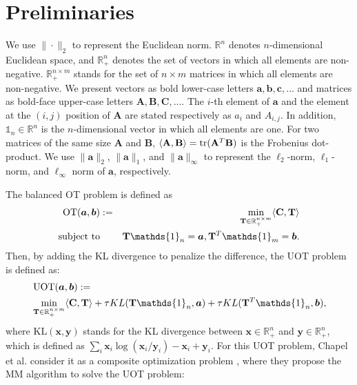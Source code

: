 \documentclass[a4paper,twocolumn]{article}
\newcommand{\R}{\mathbb{R}}
\newcommand{\one}{\mathds{1}}
\newcommand{\mat}[1]{\mathbf{#1}}
\renewcommand{\vec}[1]{\bm{#1}}
\begin{document}
\section{Preliminaries}
We use $\| \cdot \|_2$ to represent the Euclidean norm. $\mathbb{R}^n$ denotes $n$-dimensional Euclidean space, and $\mathbb{R}^n_+$ denotes the set of vectors in which all elements are non-negative. $\mathbb{R}^{n \times m}_+$ stands for the set of $n \times m$ matrices in which all elements are non-negative. We present vectors as bold lower-case letters $\vec{a},\vec{b},\vec{c},\dots$ and matrices as bold-face upper-case letters $\mat{A},\mat{B},\mat{C},\dots$. The $i$-th element of $\vec{a}$ and the element at the $(i,j)$ position of $\mat{A}$ are stated respectively as $a_i$ and ${A}_{i,j}$. In addition, $\one_n \in \mathbb{R}^n$ is the $n$-dimensional vector in which all elements are one.
For two matrices of the same size $\mat{A}$ and $\mat{B}$, $\langle \mat{A},\mat{B}\rangle={\rm tr}(\mat{A}^T\mat{B})$ is the Frobenius dot-product. We use $\|\vec{a}\|_2$, $\|\vec{a}\|_1$, and $\|\vec a\|_{\infty}$ to represent the $\ell_2$-norm, $\ell_1$-norm, and $\ell_{\infty}$ norm of $\vec{a}$, respectively.

The balanced OT problem is defined as
\begin{eqnarray}
\label{Eq:Standard_OT}
\operatorname{OT}(\vec{a},\vec{b}) &:=& \min_{ \mat{T} \in \R_{+}^{n \times m}} \langle \mat{C}, \mat{T} \rangle \\
\text{subject\ to}&& \mat{T} \one_n= \vec{a}, \mat{T}^{T}\one_m = \vec{b}. \notag
\end{eqnarray}
Then, by adding the KL divergence to penalize the difference, the UOT problem is defined as:
\begin{align}
\label{eq:uot}
&\operatorname{UOT}(\vec{a},\vec{b}) := \notag\\
&\min_{\mat{T} \in \R_{+}^{n \times m}} \langle \mat{C}, \mat{T} \rangle+ \tau KL(\mat{T} \one_n,\vec{a}) + \tau KL(\mat{T}^{T} \one_n,\vec{b}),
\end{align}
where $\mathrm{KL}(\vec{x},\vec{y})$ stands for the KL divergence between $\vec{x} \in \mathbb{R}_+^n$ and $\vec{y} \in \mathbb{R}_+^n$, which is defined as $\sum_i \vec{x}_i \log {(\vec{x}_i/\vec{y}_i)} - \vec{x}_i + \vec{y}_i$. For this UOT problem, Chapel et al. consider it as a composite optimization problem \cite{Chapel_NeurIPS_2021}, where they propose the MM algorithm to solve the UOT problem:
\end{document}
